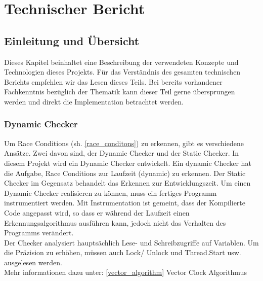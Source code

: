 \documentclass[10pt,a4paper]{article}
\begin{document}
\section{Technischer Bericht}
\subsection{Einleitung und Übersicht}
Dieses Kapitel beinhaltet eine Beschreibung der verwendeten Konzepte und Technologien dieses Projekts. Für das Verständnis des gesamten technischen Berichts empfehlen wir das Lesen dieses Teils. Bei bereits vorhandener Fachkenntnis bezüglich der Thematik kann dieser Teil gerne übersprungen werden und direkt die Implementation betrachtet werden.
\subsubsection{Dynamic Checker}
\begin{flushleft}
Um Race Conditions (sh. \ref{race_conditons}) zu erkennen, gibt es verschiedene Ansätze. Zwei davon sind, der Dynamic Checker und der Static Checker. In diesem Projekt
wird ein Dynamic Checker entwickelt. Ein dynamic Checker hat die Aufgabe, Race Conditions zur Laufzeit (dynamic) zu erkennen. Der Static Checker
im Gegensatz behandelt das Erkennen zur Entwicklungszeit. Um einen Dynamic Checker realisieren zu können, muss ein fertiges Programm instrumentiert werden.
Mit Instrumentation ist gemeint, dass der Kompilierte Code angepasst wird, so dass er während der Laufzeit einen Erkennungsalgorithmus ausführen kann, jedoch nicht das Verhalten des Programms verändert.\\
Der Checker analysiert hauptsächlich Lese- und Schreibzugriffe auf Variablen. Um die Präzision zu erhöhen, müssen auch Lock/ Unlock und Thread.Start usw. ausgelesen werden.\\
Mehr informationen dazu unter: \ref{vector_algorithm} Vector Clock Algorithmus
\end{flushleft}
\end{document}
